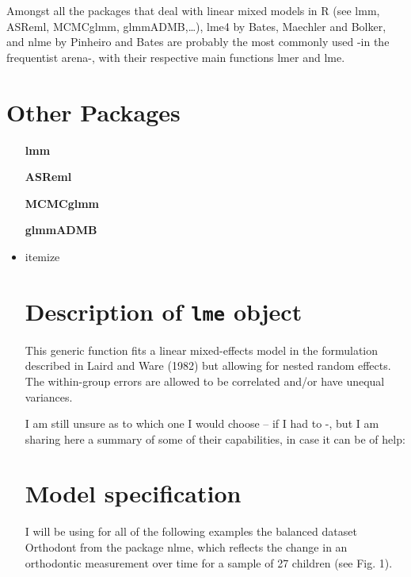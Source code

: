 Amongst all the packages that deal with linear mixed models in R (see lmm, ASReml, MCMCglmm, glmmADMB,…), lme4 by  Bates, Maechler and Bolker, and nlme by Pinheiro and Bates are probably the most commonly used -in the frequentist arena-, with their respective main functions lmer and lme.


\section*{Other Packages}

\begin{itemize}
\item[\textbf{lmm}] 
\item[\textbf{ASReml}]
\item[\textbf{MCMCglmm}]
\item[\textbf{glmmADMB}]
\item{itemize}


\section*{Description of \texttt{lme} object}

This generic function fits a linear mixed-effects model in the formulation described in Laird and Ware (1982) but allowing for nested random effects. 
The within-group errors are allowed to be correlated and/or have unequal variances.

I am still unsure as to which one I would choose – if I had to -, but I am sharing here a summary of some of their capabilities, in case it can be of help:

\section*{Model specification}

I will be using for all of the following examples the balanced dataset Orthodont from the package nlme, which reflects the change in an orthodontic measurement over time for a sample of 27 children (see Fig. 1).


\end{itemize}
